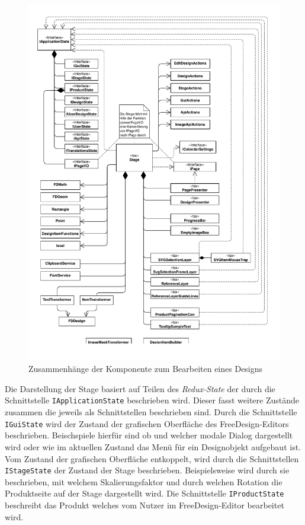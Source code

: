 \begin{figure}[H]
    \centering
    \includegraphics[width=1\textwidth]{diagrams/Ist-Architektur/Designbearbeiten.pdf}
    \caption{Zusammenhänge der Komponente zum Bearbeiten eines Designs}
    \label{fig:Designbearbeiten}
\end{figure}
Die Darstellung der Stage basiert auf Teilen des \emph{Redux-State} der durch die Schnittstelle \lstinline|IApplicationState| beschrieben wird. Dieser fasst weitere Zustände zusammen die jeweils als Schnittstellen beschrieben sind. Durch die Schnittstelle \lstinline|IGuiState| wird der Zustand der grafischen Oberfläche des FreeDesign-Editors beschrieben. Beischspiele hierfür sind 
ob und welcher modale Dialog dargestellt wird oder wie im aktuellen Zustand das Menü für ein Designobjekt aufgebaut ist.
Vom Zustand der grafischen Oberfläche entkoppelt, wird durch die Schnittstellen \lstinline|IStageState| der Zustand der Stage beschrieben. Beispielsweise wird durch sie beschrieben, mit welchem Skalierungsfaktor und durch welchen Rotation die Produktseite auf der Stage dargestellt wird. Die Schnittstelle \lstinline|IProductState| beschreibt das Produkt welches vom Nutzer im FreeDesign-Editor bearbeitet wird. 
